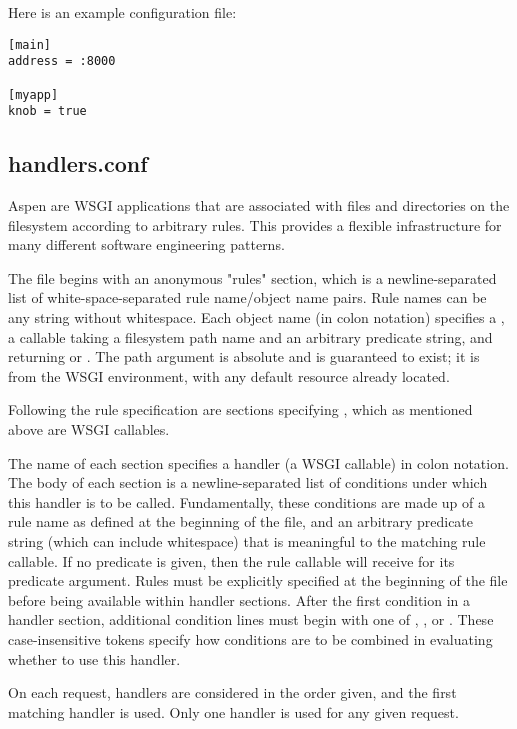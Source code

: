 Here is an example  configuration file:

\begin{verbatim}
[main]
address = :8000

[myapp]
knob = true
\end{verbatim}


\subsection{handlers.conf}
\label{handlers-conf}

Aspen  are WSGI applications that are associated with files and
directories on the filesystem according to arbitrary rules. This provides a
flexible infrastructure for many different software engineering patterns.

The  file begins with an anonymous "rules" section,
which is a newline-separated list of white-space-separated rule name/object name
pairs. Rule names can be any string without whitespace. Each object name (in
colon notation) specifies a , a callable taking a filesystem path name
and an arbitrary predicate string, and returning  or .
The path argument is absolute and is guaranteed to exist; it is
 from the WSGI environment, with any default resource
already located.

Following the rule specification are sections specifying , which
as mentioned above are WSGI callables.

The name of each section specifies a handler (a WSGI callable) in colon
notation. The body of each section is a newline-separated list of conditions
under which this handler is to be called. Fundamentally, these conditions are
made up of a rule name as defined at the beginning of the file, and an arbitrary
predicate string (which can include whitespace) that is meaningful to the
matching rule callable. If no predicate is given, then the rule callable will
receive  for its predicate argument. Rules must be explicitly
specified at the beginning of the file before being available within handler
sections. After the first condition in a handler section, additional condition
lines must begin with one of , , or . These
case-insensitive tokens specify how conditions are to be combined in evaluating
whether to use this handler.

On each request, handlers are considered in the order given, and the first
matching handler is used. Only one handler is used for any given request.

